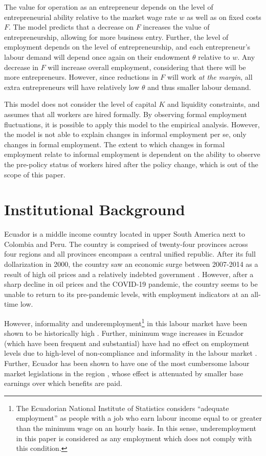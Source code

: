 \documentclass[11pt,a4paper]{article}\usepackage[]{graphicx}\usepackage[]{xcolor}
\begin{document}
The value for operation as an entrepreneur depends on the level of entrepreneurial ability relative to the market wage rate $w$ as well as on fixed costs $F$. The model predicts that a decrease on $F$ increases the value of entrepreneurship, allowing for more business entry. Further, the level of employment depends on the level of entrepreneurship, and each entrepreneur's labour demand will depend once again on their endowment $\theta$ relative to $w$. Any decrease in $F$ will increase overall employment, considering that there will be more entrepreneurs. However, since reductions in $F$ will work \textit{at the margin}, all extra entrepreneurs will have relatively low $\theta$ and thus smaller labour demand.

This model does not consider the level of capital $K$ and liquidity constraints, and assumes that all workers are hired formally. By observing formal employment fluctuations, it is possible to apply this model to the empirical analysis. However, the model is not able to explain changes in informal employment per se, only changes in formal employment. The extent to which changes in formal employment relate to informal employment is dependent on the ability to observe the pre-policy status of workers hired after the policy change, which is out of the scope of this paper.

\section{Institutional Background}

Ecuador is a middle income country located in upper South America next to Colombia and Peru. The country is comprised of twenty-four provinces across four regions and all provinces encompass a central unified republic. After its full dollarization in 2000, the country saw an economic surge between 2007-2014 as a result of high oil prices and a relatively indebted government \parencite{Weisbrot.2017}. However, after a sharp decline in oil prices and the COVID-19 pandemic, the country seems to be unable to return to its pre-pandemic levels, with employment indicators at an all-time low. 

However, informality and underemployment\footnote{The Ecuadorian National Institute of Statistics considers ``adequate employment'' as people with a job who earn labour income equal to or greater than the minimum wage on an hourly basis. In this sense, underemployment in this paper is considered as any employment which does not comply with this condition.} in this labour market have been shown to be historically high \parencite{Meneses.2021, Chavez.2012, Mendoza.2020}. Further, minimum wage increases in Ecuador (which have been frequent and substantial) have had no effect on employment levels due to high-level of non-compliance and informality in the labour market \parencite{Canelas.2014}. Further, Ecuador has been shown to have one of the most cumbersome labour market legislations in the region \parencite{MacIsaac.1997}, whose effect is attenuated by smaller base earnings over which benefits are paid.
\end{document}
